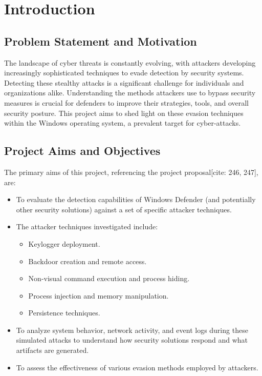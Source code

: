 \documentclass[11pt]{article}
\begin{document}
	\section{Introduction}
	\subsection{Problem Statement and Motivation}
	The landscape of cyber threats is constantly evolving, with attackers developing increasingly sophisticated techniques to evade detection by security systems. Detecting these stealthy attacks is a significant challenge for individuals and organizations alike. Understanding the methods attackers use to bypass security measures is crucial for defenders to improve their strategies, tools, and overall security posture. This project aims to shed light on these evasion techniques within the Windows operating system, a prevalent target for cyber-attacks.
	
	\subsection{Project Aims and Objectives}
	The primary aims of this project, referencing the project proposal[cite: 246, 247], are:
	\begin{itemize}
		\item To evaluate the detection capabilities of Windows Defender (and potentially other security solutions) against a set of specific attacker techniques.
		\item The attacker techniques investigated include:
		\begin{itemize}
			\item Keylogger deployment.
			\item Backdoor creation and remote access.
			\item Non-visual command execution and process hiding.
			\item Process injection and memory manipulation.
			\item Persistence techniques.
		\end{itemize}
		\item To analyze system behavior, network activity, and event logs during these simulated attacks to understand how security solutions respond and what artifacts are generated.
		\item To assess the effectiveness of various evasion methods employed by attackers.
	\end{itemize}
	
\end{document}
